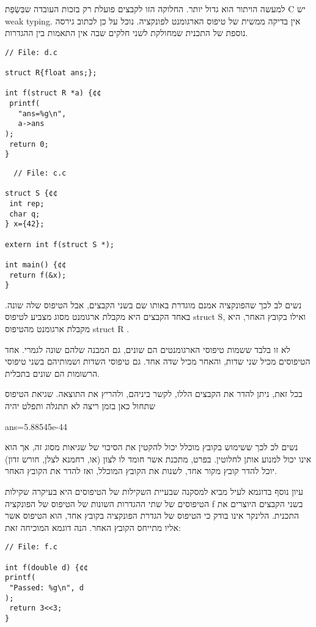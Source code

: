 \begin{טבלא}[!htbp]
      למעשה הויתור הוא גדול יותר. החלוקה הזו לקבצים פועלת רק בזכות העובדה שבִּשְׂפַת C יש weak typing. אין בדיקה ממשית של טיפוס הארגומנט לפונקציה. נוכל על כן לכתוב גירסה נוספת של התכנית שמחולקת לשני חלקים שבה אין התאמות בין ההגדרות.

\begin{verbatim}
// File: d.c

struct R{float ans;};

int f(struct R *a) {¢¢
 printf(
   "ans=%g\n",
   a->ans
);
 return 0;
}
\end{verbatim}

\begin{verbatim}
  // File: c.c

struct S {¢¢
 int rep;
 char q;
} x={42};

extern int f(struct S *);

int main() {¢¢
 return f(&x);
}
\end{verbatim}

      נשים לב לכך שהפונקציה אמנם מוגדרת באותו שם בשני הקבצים, אבל הטיפוס שלה שונה.
      באחד הקבצים היא מקבלת ארגומנט מסוג מצביע לטיפוס struct S, ואילו בקובץ האחר, היא
      מקבלת ארגומנט מהטיפוס struct R .

      לא זו בלבד ששמות טיפוסי הארגומנטים הם שונים, גם המבנה שלהם שונה לגמרי. אחד
      הטיפוסים מכיל שני שדות, והאחר מכיל שדה אחד. גם טיפוסי השדות ושמותיהם בשני
      טיפוסי הרשומות הם שונים בתכלית.

      בכל זאת, ניתן להדר את הקבצים הללו, לקשר ביניהם, ולהריץ את התוצאה. שגיאת הטיפוס
      שתחול כאן בזמן ריצה לא תתגלה ותפלט יהיה

      ans=5.88545e-44

      נשים לכ לכך ששימוש בקובץ מוכלל יכול להקטין את הסיכוי של שגיאות מסוג זה, אך הוא
      אינו יכול למנוע אותן לחלוטין. בפרט, מתכנת אשר חומד לו לצון (או, רחמנא לצלן,
      חורש זדון) יוכל להדר קובץ מקור אחד, לשנות את הקובץ המוכלל, ואז להדר את הקובץ
      האחר.

      עיון נוסף בדוגמא לעיל מביא למסקנה שבעיית השקילות של הטיפוסים היא בעיקרה שקילות
      הטיפוסים של שתי ההגדרות השונות של הטיפוס של הפונקציה f בשני הקבצים היוצרים את
      התכנית. הלינקר אינו בודק כי הטיפוס של הגדרת הפונקציה בקובץ אחד, הוא הטיפוס אשר
      אליו מתייחס הקובץ האחר. הנה דוגמא המוכיחה זאת:

\begin{verbatim}
// File: f.c

int f(double d) {¢¢
printf(
 "Passed: %g\n", d
);
 return 3<<3;
}
\end{verbatim}


\end{טבלא}
